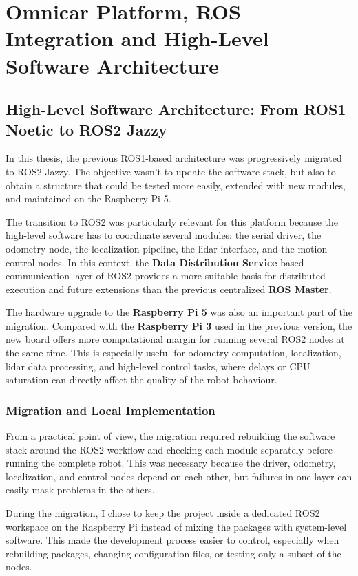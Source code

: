 \chapter{Omnicar Platform, ROS Integration and High-Level Software Architecture }

  \section{High-Level Software Architecture: From ROS1 Noetic to ROS2 Jazzy}
  In this thesis, the previous ROS1-based architecture was progressively migrated to ROS2 Jazzy.
  The objective wasn't to update the software stack, but also to obtain a structure that could be tested more easily, extended with new modules, and maintained on the Raspberry Pi 5.

  The transition to ROS2 was particularly relevant for this platform because the high-level software has to coordinate several modules: the serial driver, the odometry node, the localization pipeline, the lidar interface, and the motion-control nodes. In this context, the \textbf{Data Distribution Service} based communication layer of ROS2 provides a more suitable basis for distributed execution and future extensions than the previous centralized \textbf{ROS Master}.

  The hardware upgrade to the \textbf{Raspberry Pi 5} was also an important part of the migration. Compared with the \textbf{Raspberry Pi 3} used in the previous version, the new board offers more computational margin for running several ROS2 nodes at the same time. This is especially useful for odometry computation, localization, lidar data processing, and high-level control tasks, where delays or CPU saturation can directly affect the quality of the robot behaviour.

  \subsection{Migration and Local Implementation}
  From a practical point of view, the migration required rebuilding the software stack around the ROS2 workflow and checking each module separately before running the complete robot. This was necessary because the driver, odometry, localization, and control nodes depend on each other, but failures in one layer can easily mask problems in the others.

  During the migration, I chose to keep the project inside a dedicated ROS2 workspace on the Raspberry Pi instead of mixing the packages with system-level software. This made the development process easier to control, especially when rebuilding packages, changing configuration files, or testing only a subset of the nodes.

